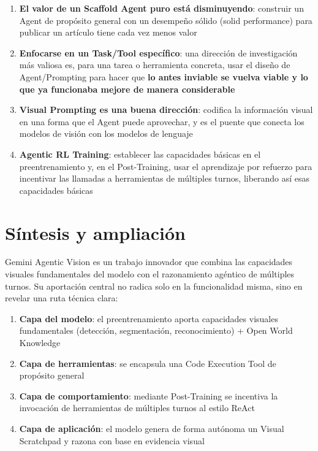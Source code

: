 \documentclass[a4paper]{article}
\begin{document}
\begin{enumerate}
    \item \textbf{El valor de un Scaffold Agent puro está disminuyendo}: construir un Agent de propósito general con un desempeño sólido (solid performance) para publicar un artículo tiene cada vez menos valor
    \item \textbf{Enfocarse en un Task/Tool específico}: una dirección de investigación más valiosa es, para una tarea o herramienta concreta, usar el diseño de Agent/Prompting para hacer que \textbf{lo antes inviable se vuelva viable y lo que ya funcionaba mejore de manera considerable}
    \item \textbf{Visual Prompting es una buena dirección}: codifica la información visual en una forma que el Agent puede aprovechar, y es el puente que conecta los modelos de visión con los modelos de lenguaje
    \item \textbf{Agentic RL Training}: establecer las capacidades básicas en el preentrenamiento y, en el Post-Training, usar el aprendizaje por refuerzo para incentivar las llamadas a herramientas de múltiples turnos, liberando así esas capacidades básicas
\end{enumerate}

\section{Síntesis y ampliación}

Gemini Agentic Vision es un trabajo innovador que combina las capacidades visuales fundamentales del modelo con el razonamiento agéntico de múltiples turnos. Su aportación central no radica solo en la funcionalidad misma, sino en revelar una ruta técnica clara:

\begin{enumerate}
    \item \textbf{Capa del modelo}: el preentrenamiento aporta capacidades visuales fundamentales (detección, segmentación, reconocimiento) + Open World Knowledge
    \item \textbf{Capa de herramientas}: se encapsula una Code Execution Tool de propósito general
    \item \textbf{Capa de comportamiento}: mediante Post-Training se incentiva la invocación de herramientas de múltiples turnos al estilo ReAct
    \item \textbf{Capa de aplicación}: el modelo genera de forma autónoma un Visual Scratchpad y razona con base en evidencia visual
\end{enumerate}
\end{document}

